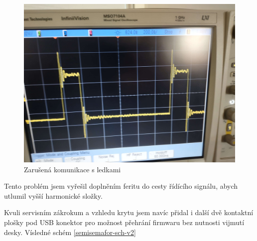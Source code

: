 \begin{figure}[!h]
  \begin{center}
    \includegraphics[width=\textwidth]{text/PraktickaCast/img/trampolina.jpg}
  \end{center}
  \label{semisemafor-zvonek}
  \caption{Zarušená komunikace s ledkami}
\end{figure}

Tento problém jsem vyřešil doplněním feritu do cesty řídícího signálu, abych utlumil vyšší harmonické složky.

Kvuli servisním zákrokum a vzhledu krytu jsem navíc přidal i další dvě kontaktní plošky pod USB konektor pro možnost přehrání firmwaru bez nutnosti vijmutí desky.
Vísledné schém \ref{semisemafor-sch-v2}


